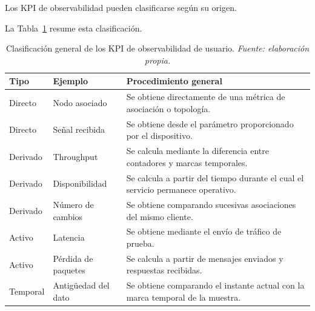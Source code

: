 Los KPI de observabilidad pueden clasificarse según su origen.

La Tabla~\ref{tab:clasificacion-kpi-observabilidad} resume esta
clasificación.

\begin{table}[H]
    \centering
    \small
    \renewcommand{\arraystretch}{1.35}

    \caption[Clasificación de los KPI de observabilidad.]
    {Clasificación general de los KPI de observabilidad de usuario.
    \textit{Fuente: elaboración propia.}}

    \label{tab:clasificacion-kpi-observabilidad}

    \begin{tabular}{
        p{}
        p{}
        p{}
    }
        \hline

        \textbf{Tipo}
        &
        \textbf{Ejemplo}
        &
        \textbf{Procedimiento general}
        \\

        \hline

        Directo
        &
        Nodo asociado
        &
        Se obtiene directamente de una métrica de asociación o
        topología.
        \\

        Directo
        &
        Señal recibida
        &
        Se obtiene desde el parámetro proporcionado por el dispositivo.
        \\

        Derivado
        &
        Throughput
        &
        Se calcula mediante la diferencia entre contadores y marcas
        temporales.
        \\

        Derivado
        &
        Disponibilidad
        &
        Se calcula a partir del tiempo durante el cual el servicio
        permanece operativo.
        \\

        Derivado
        &
        Número de cambios
        &
        Se obtiene comparando sucesivas asociaciones del mismo cliente.
        \\

        Activo
        &
        Latencia
        &
        Se obtiene mediante el envío de tráfico de prueba.
        \\

        Activo
        &
        Pérdida de paquetes
        &
        Se calcula a partir de mensajes enviados y respuestas recibidas.
        \\

        Temporal
        &
        Antigüedad del dato
        &
        Se obtiene comparando el instante actual con la marca temporal de
        la muestra.
        \\

        \hline
    \end{tabular}
\end{table}



